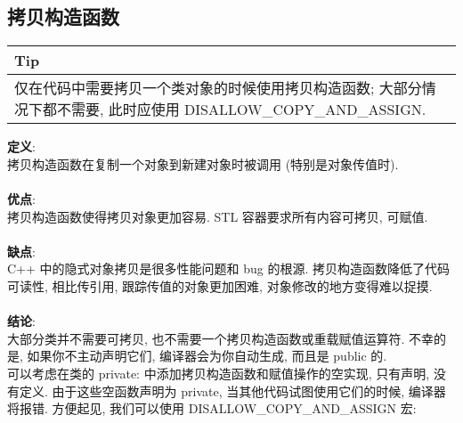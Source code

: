 \documentclass[a4paper,11pt,CJK]{article}
\begin{document}
\begin{CJK}{UTF8}{gbsn}
\subsection{拷贝构造函数}
\begin{table}[htbp]
\flushleft
\begin{tabular}{p{400pt}}
\toprule
\rowcolor[gray]{.8} Tip \\
\midrule
仅在代码中需要拷贝一个类对象的时候使用拷贝构造函数; 大部分情况下都不需要, 此时应使用 DISALLOW\_COPY\_AND\_ASSIGN.\\
\bottomrule
\end{tabular}
\end{table}
\noindent
\textbf{定义}:\\
\indent 拷贝构造函数在复制一个对象到新建对象时被调用 (特别是对象传值时).\\
\\
\textbf{优点}:\\
\indent 拷贝构造函数使得拷贝对象更加容易. STL 容器要求所有内容可拷贝, 可赋值.\\
\\
\textbf{缺点}:\\
\indent C++ 中的隐式对象拷贝是很多性能问题和 bug 的根源. 拷贝构造函数降低了代码可读性, 相比传引用, 跟踪传值的对象更加困难, 对象修改的地方变得难以捉摸.\\
\\
\textbf{结论}:\\
\indent 大部分类并不需要可拷贝, 也不需要一个拷贝构造函数或重载赋值运算符. 不幸的是, 如果你不主动声明它们, 编译器会为你自动生成, 而且是 public 的.\\
\indent 可以考虑在类的 private: 中添加拷贝构造函数和赋值操作的空实现, 只有声明, 没有定义. 由于这些空函数声明为 private, 当其他代码试图使用它们的时候, 编译器将报错. 方便起见, 我们可以使用 DISALLOW\_COPY\_AND\_ASSIGN 宏:\\
\\
\end{CJK}
\end{document}
